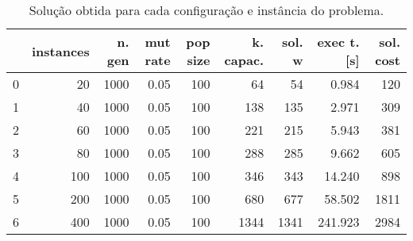 \documentclass{article}
\begin{document}
\begin{table}
\centering
\begin{tabular}{lrrrrrrrr}
\toprule
{} &  instances &  n. gen &  mut rate &  pop size &  k. capac. &  sol. w &  exec t. [s] &  sol. cost \\
\midrule
0 &         20 &    1000 &      0.05 &       100 &         64 &      54 &        0.984 &        120 \\
1 &         40 &    1000 &      0.05 &       100 &        138 &     135 &        2.971 &        309 \\
2 &         60 &    1000 &      0.05 &       100 &        221 &     215 &        5.943 &        381 \\
3 &         80 &    1000 &      0.05 &       100 &        288 &     285 &        9.662 &        605 \\
4 &        100 &    1000 &      0.05 &       100 &        346 &     343 &       14.240 &        898 \\
5 &        200 &    1000 &      0.05 &       100 &        680 &     677 &       58.502 &       1811 \\
6 &        400 &    1000 &      0.05 &       100 &       1344 &    1341 &      241.923 &       2984 \\
\bottomrule
\end{tabular}
\caption{Solução obtida para cada configuração e instância do problema.}
\label{table:all-data}
\end{table}
\end{document}
